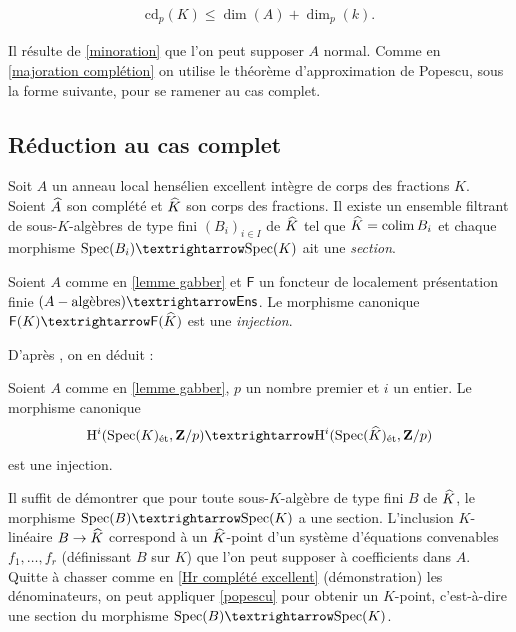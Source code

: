 \documentclass[10pt]{smfart-moi}
\begin{document}
\begin{eqnarray}\label{majoration mixte}
\mathrm{cd}_p(K)≤\dim(A)+\dim_p(k).
\end{eqnarray}

Il résulte de \ref{minoration} que l'on peut supposer 
$A$ normal. Comme en \ref{majoration complétion}
on utilise le théorème d'approximation de Popescu, sous la forme suivante, 
pour se ramener au cas complet.

\subsection{Réduction au cas complet}

\begin{lmm2}\label{lemme gabber}
Soit $A$ un anneau local hensélien excellent intègre de corps des fractions $K$.
Soient $\widehat{A}$ son complété et $\widehat{K}$ son corps des fractions.
Il existe un ensemble filtrant de sous-$K$-algèbres de type fini 
$(B_i)_{i∈I}$ de $\widehat{K}$ tel que $\widehat{K}={\mathrm{colim}} \,B_i$ et chaque morphisme
$\SP(B_i)→\SP(K)$ ait une \emph{section}. 
\end{lmm2}

\begin{crl2}\label{foncteur pf}
Soient $A$ comme en \ref{lemme gabber} et $\mathsf{F}$ un foncteur de localement présentation finie
$(A-\textrm{algèbres})→\Ens$.
Le morphisme canonique $\mathsf{F}(K)→\mathsf{F}(\chap{K})$
est une \emph{injection}.
\end{crl2}

D'après , on en déduit :

\begin{crl2}
Soient $A$ comme en \ref{lemme gabber}, $p$ un nombre premier
et $i$ un entier.
Le morphisme canonique
$$
\HH^{i}(\SP(K)_{\et},\ZZ/p)→\HH^{i}(\SP(\chap{K})_{\et},\ZZ/p)
$$
est une injection.
\end{crl2}

\begin{démo}
Il suffit de démontrer que pour toute sous-$K$-algèbre de type fini
$B$ de $\widehat{K}$, le morphisme $\SP(B)→\SP(K)$ a une section.
L'inclusion $K$-linéaire $B\rightarrow \widehat{K}$ correspond à un $\widehat{K}$-point
d'un système d'équations convenables $f_1,\dots,f_r$ (définissant
$B$ sur $K$) que l'on peut supposer à coefficients dans $A$. Quitte 
à chasser comme en \ref{Hr complété excellent} (démonstration) 
les dénominateurs, on peut appliquer \ref{popescu} pour obtenir un $K$-point,
c'est-à-dire une section du morphisme $\SP(B)→\SP(K)$.
\end{démo}
\end{document}

